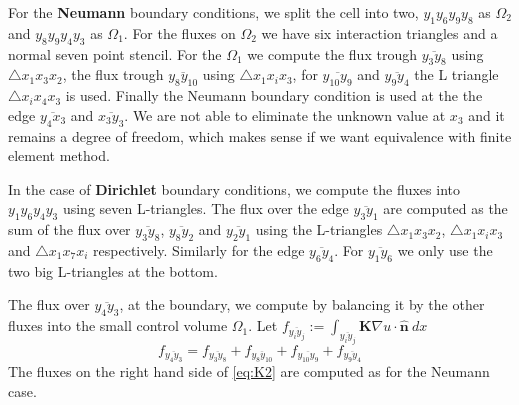 \documentclass[../Main/main.tex]{subfiles}
\begin{document}
	For the \textbf{Neumann} boundary conditions, we split the cell into two, $y_1 y_6 y_9 y_8$ as $\Omega_2$ and $y_8 y_9 y_4 y_3$ as  $\Omega_1$. For the fluxes on $\Omega_2$ we have six interaction triangles and a normal seven point stencil. For the $\Omega_1$ we compute the flux trough $\overline{y_3 y_8}$ using $\triangle x_1 x_3 x_2$, the flux trough $\overline{y_8 y_{10}}$ using $\triangle x_1 x_i x_3$, for $\overline{y_{10}y_9}$ and $\overline{y_9 y_4}$ the L triangle  $\triangle x_i x_4 x_3$ is used. Finally the Neumann boundary condition is used at the the edge $\overline{y_4 x_3}$ and $\overline{x_3 y_3}$. We are not able to eliminate the unknown value at $x_3$ and it remains a degree of freedom, which makes sense if we want equivalence with finite element method.
	\par
	In the case of \textbf{Dirichlet} boundary conditions, we compute the fluxes into $y_1 y_6 y_4 y_3$ using seven L-triangles. The flux over the edge $\overline{y_3 y_1}$ are computed as the sum of the flux over $\overline{y_3 y_8}$, $\overline{y_8 y_2}$ and $\overline{y_2 y_1}$ using the L-triangles $\triangle x_1 x_3 x_2$, $\triangle x_1 x_i x_3$ and $\triangle x_1 x_7 x_i$ respectively. Similarly for the edge $\overline{y_6 y_4}$. For $\overline{y_1 y_6}$ we only use the two big L-triangles at the bottom. 
	\par 
	The flux over $\overline{y_4 y_3}$, at the boundary, we compute by balancing it by the other fluxes into the small control volume $\Omega_1$. Let $	f_{\overline{y_i y_j}}:= \int_{\overline{y_i y_j}}  \pmb{K}\nabla u \cdot \pmb{\hat{n}}\ dx $
	\begin{equation}\label{eq:K2}
		f_{\overline{y_4 y_3}} = f_{\overline{y_3 y_8}} + f_{\overline{y_8 y_{10}}}+f_{\overline{y_{10}y_9}}+f_{\overline{y_9 y_4}}
	\end{equation}
	The fluxes on the right hand side of \eqref{eq:K2} are computed as for the Neumann case.
\end{document}
